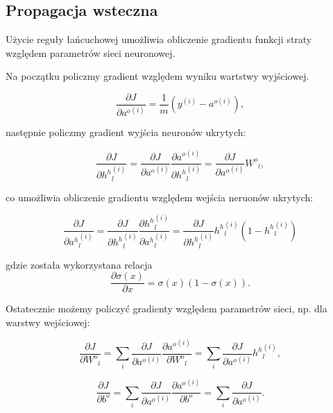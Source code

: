 \documentclass[]{article}
\theoremstyle{definition}
\begin{document}
\subsection{Propagacja wsteczna}


Użycie reguły łańcuchowej umożliwia obliczenie gradientu funkcji straty względem parametrów sieci neuronowej.

Na początku policzmy gradient względem wyniku wartstwy wyjściowej.



\begin{equation}
\frac{\partial J}{\partial {a^o}^{(i)}} = \frac{1}{m} \left( y^{(i)}- a^{o{(i)}}  \right),
\end{equation}

następnie policzmy gradient wyjścia neuronów ukrytych:

\begin{equation}
\frac{\partial J}{\partial {h^h}^{(i)}_l} = \frac{\partial J}{\partial {a^o}^{(i)}} \frac{\partial {a^o}^{(i)}}{\partial {h^h}^{(i)}_l} =  \frac{\partial J}{\partial {a^o}^{(i)}} {W^o}_{l},
\end{equation}

co umożliwia obliczenie gradientu względem wejścia neruonów ukrytych:

\begin{equation}
\frac{\partial J}{\partial {a^h}^{(i)}_l} = \frac{\partial J}{\partial {h^h}^{(i)}_l}\frac{\partial {h^h}^{(i)}_l}{\partial {a^h}^{(i)}_l} = \frac{\partial J}{\partial {h^h}^{(i)}_l} {h^h}^{(i)}_l(1-{h^h}^{(i)}_l) 
\end{equation}

gdzie została wykorzystana relacja
$$\frac{\partial \sigma(x)}{\partial x} = \sigma(x)(1-\sigma(x)).$$


Ostatecznie możemy policzyć gradienty względem parametrów sieci, np. dla warstwy wejściowej:

\begin{equation}
\frac{\partial J}{\partial {W^o}_{l}} = \sum_{i}\frac{\partial J}{\partial {a^o}^{(i)}}\frac{\partial {a^o}^{(i)}}{\partial {W^o}_{l}} = \sum_{i}\frac{\partial J}{\partial {a^o}^{(i)}}{h^h}^{(i)}_l,
\end{equation}

\begin{equation}
\frac{\partial J}{\partial {b^o}} = \sum_{i}\frac{\partial J}{\partial {a^o}^{(i)}}\frac{\partial {a^o}^{(i)}}{\partial {b^o}} = \sum_{i}\frac{\partial J}{\partial {a^o}^{(i)}}.
\end{equation}
\end{document}

